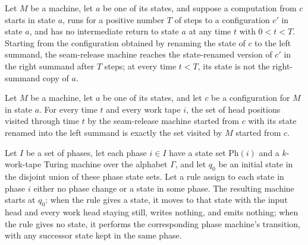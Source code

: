 \begin{theorem}
\label{Turing.seamReleaseTM_firstReturn}
\leanok
{}
Let $M$ be a machine, let $a$ be one of its states, and suppose a computation from $c$
starts in state $a$, runs for a positive number $T$ of steps to a configuration $c'$ in
state $a$, and has no intermediate return to state $a$ at any time $t$ with $0<t<T$.
Starting from the configuration obtained by renaming the state of $c$ to the left
summand, the seam-release machine reaches the state-renamed version of $c'$ in the right
summand after $T$ steps; at every time $t<T$, its state is not the right-summand copy of
$a$.
\end{theorem}

\begin{theorem}
\label{Turing.seamReleaseTM_visitedByTapeHead}
\leanok
{}
Let $M$ be a machine, let $a$ be one of its states, and let $c$ be a configuration for
$M$ in state $a$. For every time $t$ and every work tape $i$, the set of head positions
visited through time $t$ by the seam-release machine started from $c$ with its state
renamed into the left summand is exactly the set visited by $M$ started from $c$.
\end{theorem}

\begin{definition}
\label{Turing.phaseHostTM}
\leanok
{}
Let $I$ be a set of phases, let each phase $i\in I$ have a state set $\mathrm{Ph}(i)$
and a $k$-work-tape Turing machine over the alphabet $\Gamma$, and let $q_0$ be an
initial state in the disjoint union of these phase state sets. Let a rule assign to each
state in phase $i$ either no phase change or a state in some phase. The resulting
machine starts at $q_0$: when the rule gives a state, it moves to that state with the
input head and every work head staying still, writes nothing, and emits nothing; when
the rule gives no state, it performs the corresponding phase machine’s transition, with
any successor state kept in the same phase.
\end{definition}

